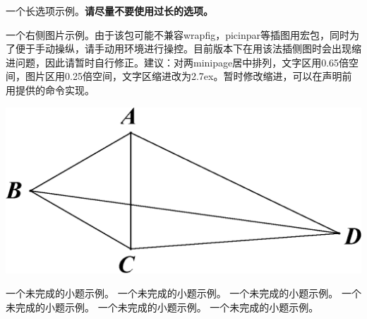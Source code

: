 \documentclass{exammath}
\begin{document}
    \simpleproblem 一个长选项示例。\textbf{请尽量不要使用过长的选项。}
    \begin{center}
        \begin{minipage}[c]{.65\textwidth}
            \par
            \setindent{2.7ex}
            \simpleproblem 一个右侧图片示例。由于该包可能不兼容wrapfig，picinpar等插图用宏包，同时为了便于手动操纵，请手动用环境进行操控。目前版本下在用该法插侧图时会出现缩进问题，因此请暂时自行修正。建议：对两minipage居中排列，文字区用0.65倍空间，图片区用0.25倍空间，文字区缩进改为2.7ex。暂时修改缩进，可以在声明前用提供的命令实现。
        \end{minipage}
        \begin{minipage}[c]{.25\textwidth}
            \includegraphics[width=\textwidth]{21-1.eps}
        \end{minipage}
    \end{center}
    
    \simpleproblem 一个未完成的小题示例。
    \simpleproblem 一个未完成的小题示例。
    \simpleproblem 一个未完成的小题示例。
    \simpleproblem 一个未完成的小题示例。
    \simpleproblem 一个未完成的小题示例。
    \simpleproblem 一个未完成的小题示例。
    
\end{document}
